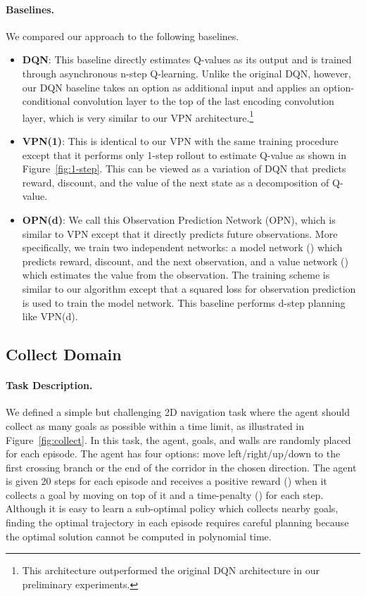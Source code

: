 \documentclass{article}
\newcommand{\cutsubsectionup}{\vspace*{-0.04in}}
\newcommand{\cutsubsectiondown}{\vspace*{-0.03in}}
\begin{document}
\paragraph{Baselines.} We compared our approach to the following baselines.
\begin{itemize}[leftmargin=*]
\item \textbf{DQN}: This baseline directly estimates Q-values as its output and is trained through asynchronous n-step Q-learning. Unlike the original DQN, however, our DQN baseline takes an option as additional input and applies an option-conditional convolution layer to the top of the last encoding convolution layer, which is very similar to our VPN architecture.\footnote{This architecture outperformed the original DQN architecture in our preliminary experiments.} 
\item \textbf{VPN(1)}: This is identical to our VPN with the same training procedure except that it performs only 1-step rollout to estimate Q-value as shown in Figure~\ref{fig:1-step}. This can be viewed as a variation of DQN that predicts reward, discount, and the value of the next state as a decomposition of Q-value.
\item \textbf{OPN(d)}: We call this Observation Prediction Network (OPN), which is similar to VPN except that it directly predicts future observations. More specifically, we train two independent networks: a model network () which predicts reward, discount, and the next observation, and a value network () which estimates the value from the observation. The training scheme is similar to our algorithm except that a squared loss for observation prediction is used to train the model network. This baseline performs d-step planning like VPN(d). \end{itemize}



\cutsubsectionup
\subsection{Collect Domain} \label{exp:collect}
\cutsubsectiondown

\paragraph{Task Description.}
We defined a simple but challenging 2D navigation task where the agent should collect as many goals as possible within a time limit, as illustrated in Figure~\ref{fig:collect}. In this task, the agent, goals, and walls are randomly placed for each episode. The agent has four options: move left/right/up/down to the first crossing branch or the end of the corridor in the chosen direction. The agent is given 20 steps for each episode and receives a positive reward () when it collects a goal by moving on top of it and a time-penalty () for each step. Although it is easy to learn a sub-optimal policy which collects nearby goals, finding the optimal trajectory in each episode requires careful planning because the optimal solution cannot be computed in polynomial time.
\end{document}
